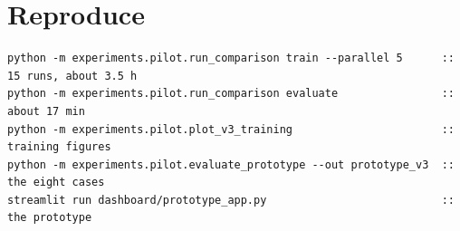 \documentclass[11pt,a4paper]{article}
\begin{document}
\section*{Reproduce}

\begin{small}
\begin{verbatim}
python -m experiments.pilot.run_comparison train --parallel 5      :: 15 runs, about 3.5 h
python -m experiments.pilot.run_comparison evaluate                :: about 17 min
python -m experiments.pilot.plot_v3_training                       :: training figures
python -m experiments.pilot.evaluate_prototype --out prototype_v3  :: the eight cases
streamlit run dashboard/prototype_app.py                           :: the prototype
\end{verbatim}
\end{small}
\end{document}

